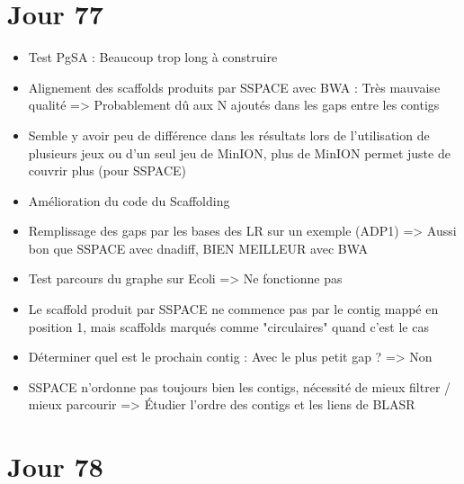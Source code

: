\documentclass[12pt]{report}
\begin{document}
\section{Jour 77}
\begin{itemize}
	\item Test PgSA : Beaucoup trop long à construire

	\item Alignement des scaffolds produits par SSPACE avec BWA : Très mauvaise qualité => Probablement dû aux N ajoutés dans les gaps entre les contigs
	
	\item Semble y avoir peu de différence dans les résultats lors de l'utilisation de plusieurs jeux ou d'un seul jeu de MinION,
		  plus de MinION permet juste de couvrir plus (pour SSPACE)
		  
	\item Amélioration du code du Scaffolding
		  
	\item Remplissage des gaps par les bases des LR sur un exemple (ADP1) => Aussi bon que SSPACE avec dnadiff, BIEN MEILLEUR avec BWA
	
	\item Test parcours du graphe sur Ecoli => Ne fonctionne pas
	
	\item Le scaffold produit par SSPACE ne commence pas par le contig mappé en position 1, mais scaffolds marqués comme "circulaires" quand c'est le cas
		  
	\item Déterminer quel est le prochain contig : Avec le plus petit gap ? => Non
	
	\item SSPACE n'ordonne pas toujours bien les contigs, nécessité de mieux filtrer / mieux parcourir => Étudier l'ordre des contigs
		  et les liens de BLASR
\end{itemize}

\section{Jour 78}
\end{document}
